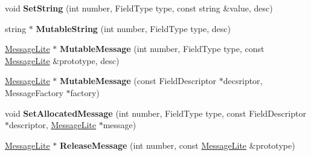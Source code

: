 \begin{DoxyCompactItemize}
\item 
\mbox{\label{classgoogle_1_1protobuf_1_1internal_1_1ExtensionSet_a6e3f1d26769f7af36ead9bd9db481af6}} 
void {\bfseries Set\+String} (int number, Field\+Type type, const string \&value, desc)
\item 
\mbox{\label{classgoogle_1_1protobuf_1_1internal_1_1ExtensionSet_a9993f12c36690cdd9ced2d8f27131ecf}} 
string $\ast$ {\bfseries Mutable\+String} (int number, Field\+Type type, desc)
\item 
\mbox{\label{classgoogle_1_1protobuf_1_1internal_1_1ExtensionSet_a2eaaa0da36dffb9c31b6576f06234b4b}} 
\hyperlink{classgoogle_1_1protobuf_1_1MessageLite}{Message\+Lite} $\ast$ {\bfseries Mutable\+Message} (int number, Field\+Type type, const \hyperlink{classgoogle_1_1protobuf_1_1MessageLite}{Message\+Lite} \&prototype, desc)
\item 
\mbox{\label{classgoogle_1_1protobuf_1_1internal_1_1ExtensionSet_aa7e991288e937e725e70737d5db5b345}} 
\hyperlink{classgoogle_1_1protobuf_1_1MessageLite}{Message\+Lite} $\ast$ {\bfseries Mutable\+Message} (const Field\+Descriptor $\ast$decsriptor, Message\+Factory $\ast$factory)
\item 
\mbox{\label{classgoogle_1_1protobuf_1_1internal_1_1ExtensionSet_a2b32964353e0b40f1b221ff97880cd98}} 
void {\bfseries Set\+Allocated\+Message} (int number, Field\+Type type, const Field\+Descriptor $\ast$descriptor, \hyperlink{classgoogle_1_1protobuf_1_1MessageLite}{Message\+Lite} $\ast$message)
\item 
\mbox{\label{classgoogle_1_1protobuf_1_1internal_1_1ExtensionSet_a0ab85c0f8c2977a3277ffac99bd34412}} 
\hyperlink{classgoogle_1_1protobuf_1_1MessageLite}{Message\+Lite} $\ast$ {\bfseries Release\+Message} (int number, const \hyperlink{classgoogle_1_1protobuf_1_1MessageLite}{Message\+Lite} \&prototype)
\item 
\mbox{\label{classgoogle_1_1protobuf_1_1internal_1_1ExtensionSet_aeb8648b5deb02d7bd7d5662e1c0ee41a}} 

\end{DoxyCompactItemize}
